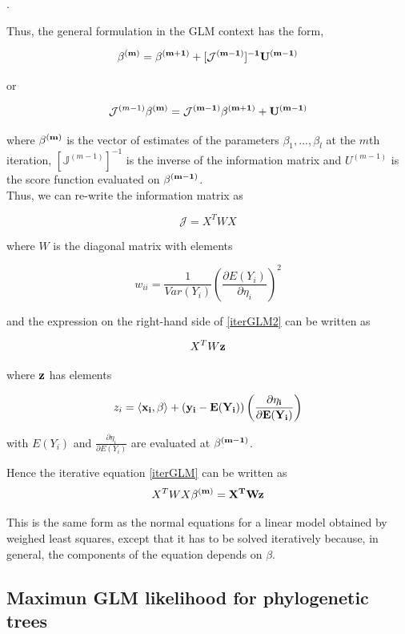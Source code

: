 .\\
\vspace{1cm}

Thus, the general formulation in the GLM context has the form,

\begin{equation} \bf{\beta}^{(m)} =  \bf{\beta}^{(m+1)} + [\mathcal{J}^{(m-1)}]^{-1}U^{(m-1)} 
\label{iterGLM}
\end{equation}

or 

\begin{equation} \mathcal{J}^{(m-1)}\bf{\beta}^{(m)} =  \mathcal{J}^{(m-1)}\bf{\beta}^{(m+1)} + U^{(m-1)} 
\label{iterGLM2}
\end{equation}


where $\bf{\beta}^{(m)}$ is the vector of estimates of the parameters $\beta_1, ... , \beta_l $ at the $m$th iteration, $[\mathbb{J}^{(m-1)}]^{-1}$ is the inverse of the information matrix and $U^{(m-1)}$ is the score function evaluated on $\bf{\beta}^{(m-1)}$. \\

Thus, we can re-write the information matrix as 

$$ \mathcal{J} = X^TWX $$

where $W$ is the diagonal matrix with elements

$$ w_{ii} = \frac{1}{Var(Y_i)}\left( \frac{\partial E(Y_i)}{\partial \eta_i} \right)^2 $$

and the expression on the right-hand side of \ref{iterGLM2} can be written as 

$$X^TW\bf{z}$$

where $\bf{z}$ has elements

$$ z_i = \langle \bf{x_i},\beta \rangle + (y_i - E(Y_i)) \left( \frac{\partial \eta_i}{\partial E(Y_i)} \right) $$

with $E(Y_i)$ and $\frac{\partial \eta_i}{\partial E(Y_i)}$ are evaluated at $\bf{\beta}^{(m-1)}$. 

Hence the iterative equation \ref{iterGLM} can be written as
%
$$X^TWX\bf{\beta}^{(m)}=X^TW\bf{z}$$
%

This is the same form as the normal equations for a linear model obtained by weighed least squares, except that it has to be solved iteratively because, in general, the components of the equation depends on $\beta$. 

\subsection{Maximun GLM likelihood for phylogenetic trees}

